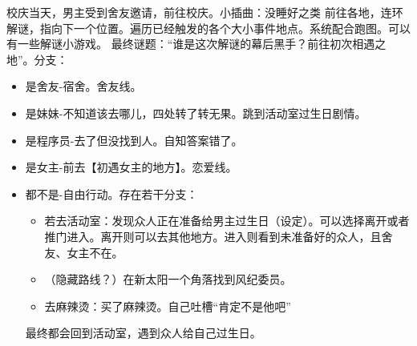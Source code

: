 校庆当天，男主受到舍友邀请，前往校庆。小插曲：没睡好之类
前往各地，连环解谜，指向下一个位置。遍历已经触发的各个大小事件地点。系统配合跑图。可以有一些解谜小游戏。
最终谜题：“谁是这次解谜的幕后黑手？前往初次相遇之地”。分支：
\begin{itemize}
    \item 是舍友-宿舍。舍友线。
    \item 是妹妹-不知道该去哪儿，四处转了转无果。跳到活动室过生日剧情。
    \item 是程序员-去了但没找到人。自知答案错了。
    \item 是女主-前去【初遇女主的地方】。恋爱线。
    \item 都不是-自由行动。存在若干分支：
    \begin{itemize}
        \item 若去活动室：发现众人正在准备给男主过生日（设定）。可以选择离开或者推门进入。离开则可以去其他地方。进入则看到未准备好的众人，且舍友、女主不在。
        \item （隐藏路线？）在新太阳一个角落找到风纪委员。
        \item 去麻辣烫：买了麻辣烫。自己吐槽“肯定不是他吧”

    \end{itemize}
         最终都会回到活动室，遇到众人给自己过生日。
\end{itemize}
    